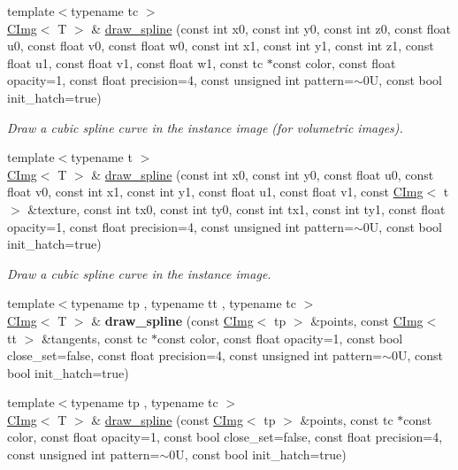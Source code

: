 \begin{DoxyCompactItemize}
{\footnotesize template$<$typename tc $>$ }\\\hyperlink{structcimg__library_1_1CImg}{CImg}$<$ T $>$ \& \hyperlink{structcimg__library_1_1CImg_a111ec303273ffc87a1be739275957c92}{draw\_\-spline} (const int x0, const int y0, const int z0, const float u0, const float v0, const float w0, const int x1, const int y1, const int z1, const float u1, const float v1, const float w1, const tc $\ast$const color, const float opacity=1, const float precision=4, const unsigned int pattern=$\sim$0U, const bool init\_\-hatch=true)
\begin{DoxyCompactList}\small\item\em Draw a cubic spline curve in the instance image (for volumetric images). \item\end{DoxyCompactList}\item 
{\footnotesize template$<$typename t $>$ }\\\hyperlink{structcimg__library_1_1CImg}{CImg}$<$ T $>$ \& \hyperlink{structcimg__library_1_1CImg_a9a80dade828f83f301f1470a6d0d474d}{draw\_\-spline} (const int x0, const int y0, const float u0, const float v0, const int x1, const int y1, const float u1, const float v1, const \hyperlink{structcimg__library_1_1CImg}{CImg}$<$ t $>$ \&texture, const int tx0, const int ty0, const int tx1, const int ty1, const float opacity=1, const float precision=4, const unsigned int pattern=$\sim$0U, const bool init\_\-hatch=true)
\begin{DoxyCompactList}\small\item\em Draw a cubic spline curve in the instance image. \item\end{DoxyCompactList}\item 
\hypertarget{structcimg__library_1_1CImg_ab6580bbd06443cd05ad8ff63c157a8e9}{
{\footnotesize template$<$typename tp , typename tt , typename tc $>$ }\\\hyperlink{structcimg__library_1_1CImg}{CImg}$<$ T $>$ \& {\bfseries draw\_\-spline} (const \hyperlink{structcimg__library_1_1CImg}{CImg}$<$ tp $>$ \&points, const \hyperlink{structcimg__library_1_1CImg}{CImg}$<$ tt $>$ \&tangents, const tc $\ast$const color, const float opacity=1, const bool close\_\-set=false, const float precision=4, const unsigned int pattern=$\sim$0U, const bool init\_\-hatch=true)}
\label{structcimg__library_1_1CImg_ab6580bbd06443cd05ad8ff63c157a8e9}

\item 
\hypertarget{structcimg__library_1_1CImg_a9e45bec57970c305acf595eb03e18e33}{
{\footnotesize template$<$typename tp , typename tc $>$ }\\\hyperlink{structcimg__library_1_1CImg}{CImg}$<$ T $>$ \& \hyperlink{structcimg__library_1_1CImg_a9e45bec57970c305acf595eb03e18e33}{draw\_\-spline} (const \hyperlink{structcimg__library_1_1CImg}{CImg}$<$ tp $>$ \&points, const tc $\ast$const color, const float opacity=1, const bool close\_\-set=false, const float precision=4, const unsigned int pattern=$\sim$0U, const bool init\_\-hatch=true)}
\label{structcimg__library_1_1CImg_a9e45bec57970c305acf595eb03e18e33}


\end{DoxyCompactItemize}
